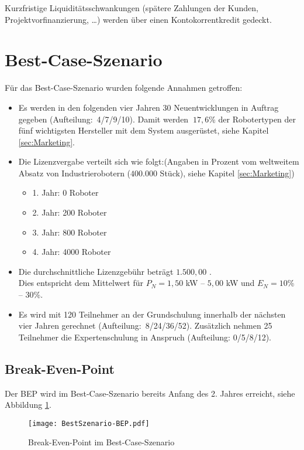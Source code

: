 \noindent Kurzfristige Liquiditätsschwankungen (spätere Zahlungen der Kunden, Projektvorfinanzierung, …) werden über einen Kontokorrentkredit gedeckt.

\newpage
\section{Best-Case-Szenario}
Für das Best-Case-Szenario wurden folgende Annahmen getroffen:
\begin{itemize}
	\item Es werden in den folgenden vier Jahren 30 Neuentwicklungen in Auftrag gegeben (Aufteilung:~4/7/9/10). Damit werden $~17,6$\% der Robotertypen der fünf wichtigsten Hersteller mit dem System ausgerüstet, siehe Kapitel \ref{sec:Marketing}.
	\item Die Lizenzvergabe verteilt sich wie folgt:\newline (Angaben in Prozent vom weltweitem Absatz von Industrierobotern ($400.000$ Stück), siehe Kapitel \ref{sec:Marketing})
	\begin{itemize}
		\item 1. Jahr: 0 Roboter
		\item 2. Jahr: 200 Roboter
		\item 3. Jahr: 800 Roboter
		\item 4. Jahr: 4000 Roboter
	\end{itemize}
	\item Die durchschnittliche Lizenzgebühr beträgt $1.500,00$ \officialeuro.\\ Dies entspricht dem Mittelwert für $P_N = 1,50$ kW -- $5,00$ kW und $E_N = 10$\% -- $30$\%.
	\item Es wird mit 120 Teilnehmer an der Grundschulung innerhalb der nächsten vier Jahren gerechnet (Aufteilung:~8/24/36/52). Zusätzlich nehmen 25 Teilnehmer die Expertenschulung in Anspruch (Aufteilung: 0/5/8/12).
\end{itemize}

\subsection{Break-Even-Point}
Der BEP wird im Best-Case-Szenario bereits Anfang des 2. Jahres erreicht, siehe Abbildung \ref{fig:BestSzenario-BEP}.
\begin{figure}[h]
	\centering
	\texttt{[image: BestSzenario-BEP.pdf]}
	\caption{Break-Even-Point im Best-Case-Szenario}
	\label{fig:BestSzenario-BEP}
\end{figure}

